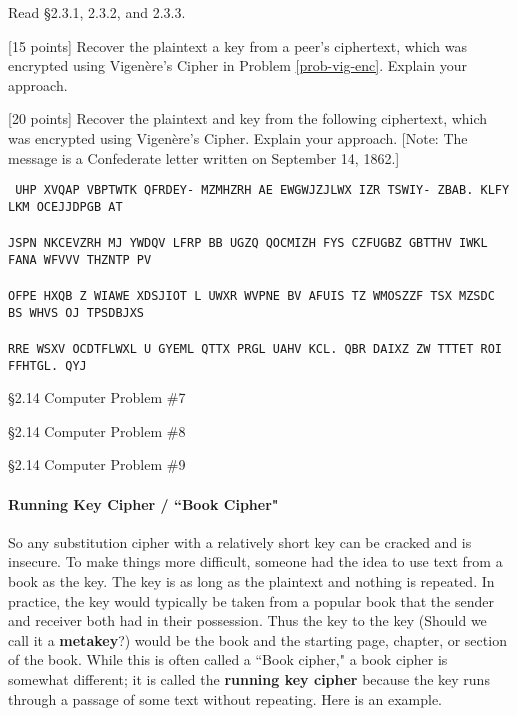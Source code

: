                 Read \S 2.3.1, 2.3.2, and 2.3.3.

\begin{problem}
\label{prob-vig-dec1} [15 points]
Recover the plaintext a key from a peer's ciphertext, which was encrypted using Vigen\`{e}re's Cipher in Problem \ref{prob-vig-enc}. Explain your approach.
\end{problem}

\begin{problem}
\label{prob-vig-dec2} [20 points]
Recover the plaintext and key from the following ciphertext, which was encrypted using Vigen\`{e}re's Cipher. Explain your approach. [Note: The message is a Confederate letter written on September 14, 1862.]
\end{problem}
{\tt
\noindent UHP XVQAP VBPTWTK QFRDEY- MZMHZRH AE EWGWJZJLWX IZR TSWIY- ZBAB. KLFY LKM OCEJJDPGB AT \\
\\
JSPN NKCEVZRH MJ YWDQV LFRP BB UGZQ QOCMIZH FYS CZFUGBZ GBTTHV IWKL FANA WFVVV THZNTP  PV \\
\\
OFPE HXQB Z WIAWE XDSJIOT L UWXR WVPNE BV AFUIS TZ WMOSZZF TSX MZSDC BS WHVS OJ TPSDBJXS\\
\\
 RRE WSXV OCDTFLWXL U GYEML QTTX PRGL UAHV KCL. QBR DAIXZ ZW TTTET ROI FFHTGL. QYJ
 }


\begin{problem}  [15 points]
\S 2.14 Computer Problem \#7
\end{problem}

\begin{problem}  [15 points]
\S 2.14 Computer Problem \#8
\end{problem}

\begin{problem}  [15 points]
\S 2.14 Computer Problem \#9
\end{problem}

			\paragraph*{Running Key Cipher / ``Book Cipher"}

                 So any substitution cipher with a relatively short key can be cracked and is insecure. To make things more difficult, someone had the idea to use text from a book as the key. The key is as long as the plaintext and nothing is repeated. In practice, the key would typically be taken from a popular book that the sender and receiver both had in their possession. Thus the key to the key (Should we call it a {\bf metakey}?) would be the book and the starting page, chapter, or section of the book. While this is often called a ``Book cipher," a book cipher is somewhat different; it is called the {\bf running key cipher}  because the key runs through a passage of some text without repeating. Here is an example.

